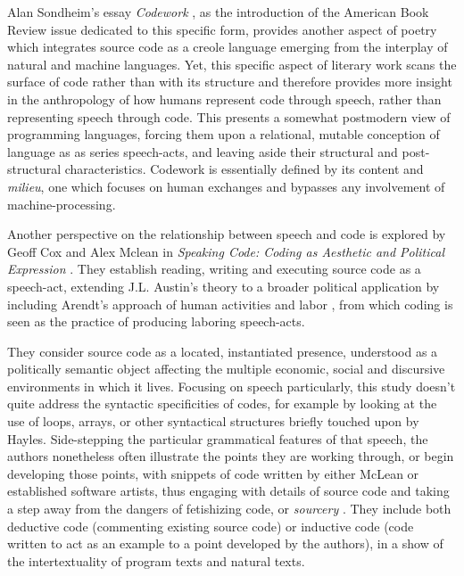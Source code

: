 Alan Sondheim's essay \emph{Codework} \citep{sondheim_introduction_2001}, as the introduction of the American Book Review issue dedicated to this specific form, provides another aspect of poetry which integrates source code as a creole language emerging from the interplay of natural and machine languages. Yet, this specific aspect of literary work scans the surface of code rather than with its structure and therefore provides more insight in the anthropology of how humans represent code through speech, rather than representing speech through code. This presents a somewhat postmodern view of programming languages, forcing them upon a relational, mutable conception of language as as series speech-acts, and leaving aside their structural and post-structural characteristics. Codework is essentially defined by its content and \emph{milieu}, one which focuses on human exchanges and bypasses any involvement of machine-processing.

Another perspective on the relationship between speech and code is explored by Geoff Cox and Alex Mclean in \emph{Speaking Code: Coding as Aesthetic and Political Expression} \citep{cox_speaking_2013}. They establish reading, writing and executing source code as a speech-act, extending J.L. Austin's theory to a broader political application by including Arendt's approach of human activities and labor \citep{arendt_human_1998}, from which coding is seen as the practice of producing laboring speech-acts.

They consider source code as a located, instantiated presence, understood as a politically semantic object affecting the multiple economic, social and discursive environments in which it lives. Focusing on speech particularly, this study doesn't quite address the syntactic specificities of codes, for example by looking at the use of loops, arrays, or other syntactical structures briefly touched upon by Hayles. Side-stepping the particular grammatical features of that speech, the authors nonetheless often illustrate the points they are working through, or begin developing those points, with snippets of code written by either McLean or established software artists, thus engaging with details of source code and taking a step away from the dangers of fetishizing code, or \emph{sourcery} \citep{chun_sourcery_2008}. They include both deductive code (commenting existing source code) or inductive code (code written to act as an example to a point developed by the authors), in a show of the intertextuality of program texts and natural texts.

